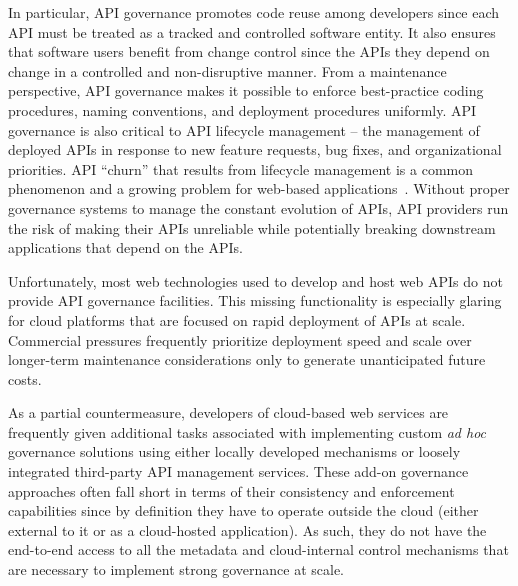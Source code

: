 In particular, API governance promotes code reuse among developers
since each API must be treated as a tracked and controlled software entity.
It also ensures that software users benefit from change control since the APIs
they depend on
change in a controlled and non-disruptive manner.  From a maintenance
perspective, API governance 
makes it possible to enforce best-practice coding procedures, 
naming conventions, and deployment procedures uniformly.
API governance is also critical to API lifecycle
management --  the management of deployed APIs in response to new feature
requests, bug fixes, and organizational priorities. 
API ``churn'' that results from lifecycle management
is a common phenomenon and a growing
problem for web-based applications~\cite{6930607}.
Without proper governance systems to manage the constant evolution of APIs,
API providers run the risk of making their APIs unreliable while potentially
breaking downstream applications that depend on the APIs.

Unfortunately, most web technologies used to develop and host web APIs do not 
provide API governance facilities. This missing functionality is
especially glaring
for cloud platforms that are focused on rapid
deployment of APIs at scale.   Commercial pressures frequently prioritize
deployment speed and scale over longer-term maintenance considerations only to
generate unanticipated future costs.

As a partial countermeasure, developers of cloud-based web services are 
frequently given
additional tasks associated with 
implementing custom {\em ad hoc} governance solutions using either locally
developed mechanisms or loosely integrated
third-party API management services. 
These add-on governance
approaches often fall short in terms of their consistency and enforcement
capabilities since
by definition they have to operate outside the
cloud (either external to it or as a cloud-hosted application). 
As such, they do not have the end-to-end 
access to all the metadata and cloud-internal control mechanisms
that are necessary to implement strong governance at scale. 